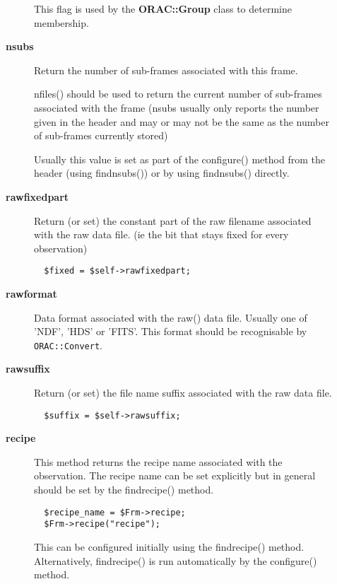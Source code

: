 \begin{description}
\begin{description}
This flag is used by the \textbf{ORAC::Group} class to determine membership.


\item[{\textbf{nsubs}}] \mbox{}

Return the number of sub-frames associated with this frame.



nfiles() should be used to return the current number of sub-frames
associated with the frame (nsubs usually only reports the number given
in the header and may or may not be the same as the number of
sub-frames currently stored)



Usually this value is set as part of the configure() method from the
header (using findnsubs()) or by using findnsubs() directly.


\item[{\textbf{rawfixedpart}}] \mbox{}

Return (or set) the constant part of the raw filename associated
with the raw data file. (ie the bit that stays fixed for every 
observation)

\begin{verbatim}
  $fixed = $self->rawfixedpart;
\end{verbatim}

\item[{\textbf{rawformat}}] \mbox{}

Data format associated with the raw() data file.
Usually one of 'NDF', 'HDS' or 'FITS'. This format should be
recognisable by \texttt{ORAC::Convert}.


\item[{\textbf{rawsuffix}}] \mbox{}

Return (or set) the file name suffix associated with
the raw data file.

\begin{verbatim}
  $suffix = $self->rawsuffix;
\end{verbatim}

\item[{\textbf{recipe}}] \mbox{}

This method returns the recipe name associated with the observation.
The recipe name can be set explicitly but in general should be
set by the findrecipe() method.

\begin{verbatim}
  $recipe_name = $Frm->recipe;
  $Frm->recipe("recipe");
\end{verbatim}


This can be configured initially using the findrecipe() method.
Alternatively, findrecipe() is run automatically by the configure()
method.



\end{description}
\end{description}

